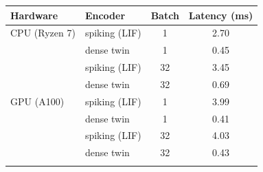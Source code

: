 \documentclass[pdflatex,sn-basic,Numbered]{sn-jnl}
\makeatletter
\newenvironment{suptable}{\par\bigskip\noindent\begin{minipage}{\textwidth}\def\@captype{table}\centering\tablebodyfont}{\end{minipage}\par\bigskip}
\makeatother
\begin{document}
\begin{suptable}
\caption{Measured cost of the spiking front-end (Section~3.3; \texttt{snn\_energy\_measured.py}): the trained LIF encoder (two layers, 128 units, 10 steps) against a dense twin of the same widths (Linear+GELU+LayerNorm). Latency = mean of 300 forward passes of a batch of the listed size after warm-up (CPU: AMD Ryzen 7; GPU: NVIDIA A100). GPU board power rose by no more than 3~W above its 85~W idle for either encoder, so no energy figure is reported, and an operation-count projection would apply only to neuromorphic hardware. Trained firing rate 7.5\% on the fold-1 checkpoint timed here.}\label{tabS9}
\scriptsize
\setlength{\tabcolsep}{3pt}\begin{tabular*}{\linewidth}{@{\extracolsep{\fill}}llcc@{}}
\toprule
Hardware & Encoder & Batch & Latency (ms) \\
\midrule
CPU (Ryzen 7) & spiking (LIF) & 1 & 2.70 \\
 & dense twin & 1 & 0.45 \\
 & spiking (LIF) & 32 & 3.45 \\
 & dense twin & 32 & 0.69 \\
GPU (A100) & spiking (LIF) & 1 & 3.99 \\
 & dense twin & 1 & 0.41 \\
 & spiking (LIF) & 32 & 4.03 \\
 & dense twin & 32 & 0.43 \\
\botrule
\end{tabular*}
\end{suptable}
\end{document}
